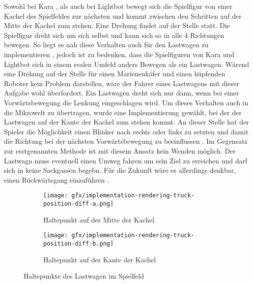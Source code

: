 Sowohl bei Kara , als auch bei Lightbot  bewegt sich die Spielfigur von einer Kachel des Spielfeldes zur nächsten und kommt zwischen den Schritten auf der Mitte der Kachel zum stehen. Eine Drehung findet auf der Stelle statt. Die Spielfigur dreht sich um sich selbst und kann sich so in alle 4 Richtungen bewegen. So liegt es nah diese Verhalten auch für den Lastwagen zu implementieren , jedoch ist zu bedenken, dass die Spielfiguren von Kara und Lightbot sich in einem realen Umfeld anders Bewegen als ein Lastwagen. Wärend eine Drehung auf der Stelle für einen Marienenkäfer und einen hüpfenden Roboter kein Problem darstellen, wäre der Fahrer eines Lastwagens mit dieser Aufgabe wohl überfordert. Ein Lastwagen dreht sich nur dann, wenn bei einer Vorwärtsbewegung die Lenkung eingeschlagen wird. Um dieses Verhalten auch in die Mikrowelt zu übertragen, wurde eine Implementierung gewählt, bei der der Lastwagen auf der Kante der Kachel zum stehen kommt. An dieser Stelle hat der Spieler die Möglichkeit einen Blinker nach rechts oder links zu setzten und damit die Richtung bei der nächsten Vorwärtsbewegung zu beeinflussen . Im Gegensatz zur erstgenannten Methode ist mit diesem Ansatz kein Wenden möglich. Der Lastwagn muss eventuell einen Umweg fahren um sein Ziel zu erreichen und darf sich in keine Sackgassen begebn. Für die Zukunft wäre es allerdings denkbar, einen Rückwärtsgang einzuführen .


\begin{figure}
  \begin{subfigure}[b]{0.45\textwidth}
    \texttt{[image: gfx/implementation-rendering-truck-position-diff-a.png]}
    \caption{Haltepunkt auf der Mitte der Kachel}
    \label{fig:implementation:rendering:truck-position:diff:a}
  \end{subfigure}\hfill
  \begin{subfigure}[b]{0.45\textwidth}
    \texttt{[image: gfx/implementation-rendering-truck-position-diff-b.png]}
    \caption{Haltepunkt auf der Kante der Kachel}
    \label{fig:implementation:rendering:truck-position:diff:b}
  \end{subfigure}\hfill
  \caption{Haltepunkte des Lastwagen im Spielfeld}
  \label{fig:implementation:rendering:truck-position:diff}
\end{figure}

